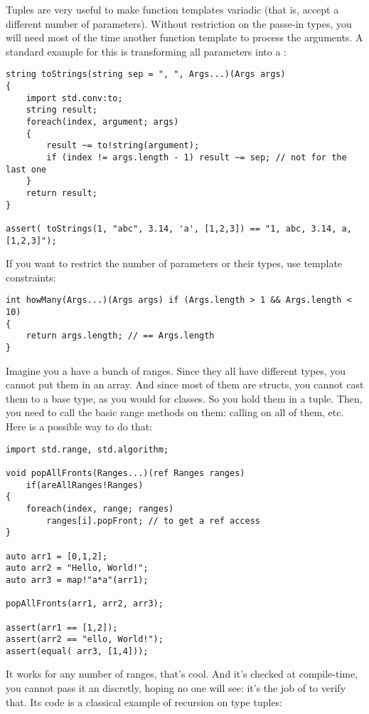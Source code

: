 Tuples are very useful to make function templates variadic (that is, accept a different number of parameters). Without restriction on the passe-in types, you will need most of the time another function template to process the arguments. A standard example for this is transforming all parameters into a :

\begin{verbatim}
string toStrings(string sep = ", ", Args...)(Args args)
{
    import std.conv:to;
    string result;
    foreach(index, argument; args)
    {
        result ~= to!string(argument);
        if (index != args.length - 1) result ~= sep; // not for the last one
    }
    return result;
}

assert( toStrings(1, "abc", 3.14, 'a', [1,2,3]) == "1, abc, 3.14, a, [1,2,3]"); 
\end{verbatim}

If you want to restrict the number of parameters or their types, use template constraints:

\begin{verbatim}
int howMany(Args...)(Args args) if (Args.length > 1 && Args.length < 10)
{
    return args.length; // == Args.length
}
\end{verbatim}

Imagine you a have a bunch of ranges. Since they all have different types, you cannot put them in an array. And since most of them are structs, you cannot cast them to a base type, as you would for classes. So you hold them in a tuple. Then, you need to call the basic range methods on them: calling  on all of them, etc. Here is a possible way to do that:

\begin{verbatim}
import std.range, std.algorithm;

void popAllFronts(Ranges...)(ref Ranges ranges) 
    if(areAllRanges!Ranges)
{
    foreach(index, range; ranges) 
        ranges[i].popFront; // to get a ref access
}

auto arr1 = [0,1,2];
auto arr2 = "Hello, World!";
auto arr3 = map!"a*a"(arr1);

popAllFronts(arr1, arr2, arr3);

assert(arr1 == [1,2]);
assert(arr2 == "ello, World!");
assert(equal( arr3, [1,4])); 
\end{verbatim}

It works for any number of ranges, that's cool. And it's checked at compile-time, you cannot pass it an  discretly, hoping no one will see: it's the job of  to verify that. Its code is a classical example of recursion on type tuples:

